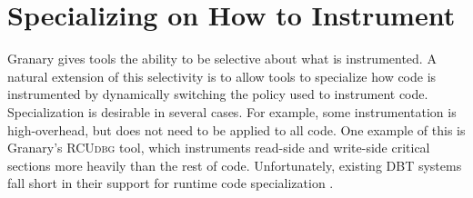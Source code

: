 \documentclass[preprint]{sigplanconf}
\newcommand{\toolname}[1]{{\scshape #1}}
\begin{document}

%
%


\section{Specializing on How to Instrument}\label{sec:how}

Granary gives tools the ability to be selective about what is instrumented. A natural extension of this selectivity is to allow tools to specialize how code is instrumented by dynamically switching the policy used to instrument code. Specialization is desirable in several cases. For example, some instrumentation is high-overhead, but does not need to be applied to all code. One example of this is Granary's \toolname{RCUdbg} tool, which instruments read-side and write-side critical sections more heavily than the rest of code. Unfortunately, existing DBT systems fall short in their support for runtime code specialization \cite{DRK,btkernel,Pin,DynamoRIO}. 
\end{document}
